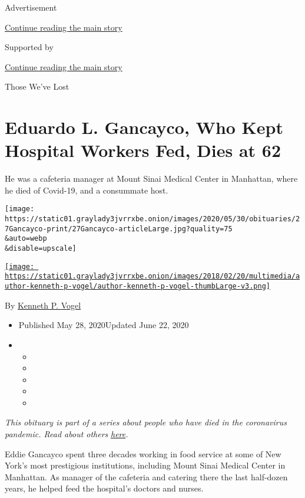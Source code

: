 Advertisement

\protect\hyperlink{after-top}{Continue reading the main story}

Supported by

\protect\hyperlink{after-sponsor}{Continue reading the main story}

Those We've Lost

\hypertarget{eduardo-l-gancayco-who-kept-hospital-workers-fed-dies-at-62}{%
\section{Eduardo L. Gancayco, Who Kept Hospital Workers Fed, Dies at
62}\label{eduardo-l-gancayco-who-kept-hospital-workers-fed-dies-at-62}}

He was a cafeteria manager at Mount Sinai Medical Center in Manhattan,
where he died of Covid-19, and a consummate host.

\texttt{[image: https://static01.graylady3jvrrxbe.onion/images/2020/05/30/obituaries/27Gancayco-print/27Gancayco-articleLarge.jpg?quality=75\\\&auto=webp\\\&disable=upscale]}

\href{https://www.nytimes3xbfgragh.onion/by/kenneth-p-vogel}{\texttt{[image: https://static01.graylady3jvrrxbe.onion/images/2018/02/20/multimedia/author-kenneth-p-vogel/author-kenneth-p-vogel-thumbLarge-v3.png]}}

By \href{https://www.nytimes3xbfgragh.onion/by/kenneth-p-vogel}{Kenneth
P. Vogel}

\begin{itemize}
\item
  Published May 28, 2020Updated June 22, 2020
\item
  \begin{itemize}
  \item
  \item
  \item
  \item
  \item
  \end{itemize}
\end{itemize}

\emph{This obituary is part of a series about people who have died in
the coronavirus pandemic. Read about others}
\href{https://www.nytimes3xbfgragh.onion/series/people-who-have-died-of-the-coronavirus}{\emph{here}}\emph{.}

Eddie Gancayco spent three decades working in food service at some of
New York's most prestigious institutions, including Mount Sinai Medical
Center in Manhattan. As manager of the cafeteria and catering there the
last half-dozen years, he helped feed the hospital's doctors and nurses.

